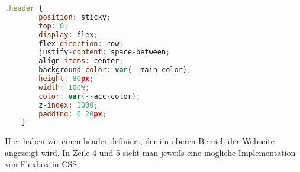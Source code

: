 \begin{lstlisting}[language=JavaScript, caption={Flexbox}, label={lst:flexbox}]
    .header {
        position: sticky;
        top: 0;
        display: flex;
        flex-direction: row;
        justify-content: space-between;
        align-items: center;
        background-color: var(--main-color);
        height: 80px;
        width: 100%;
        color: var(--acc-color);
        z-index: 1000;
        padding: 0 20px;
    }
\end{lstlisting}

Hier haben wir einen header definiert, der im oberen Bereich der Webseite angezeigt wird. In Zeile 4 und 5 sieht man jeweils eine mögliche Implementation von Flexbox in CSS.